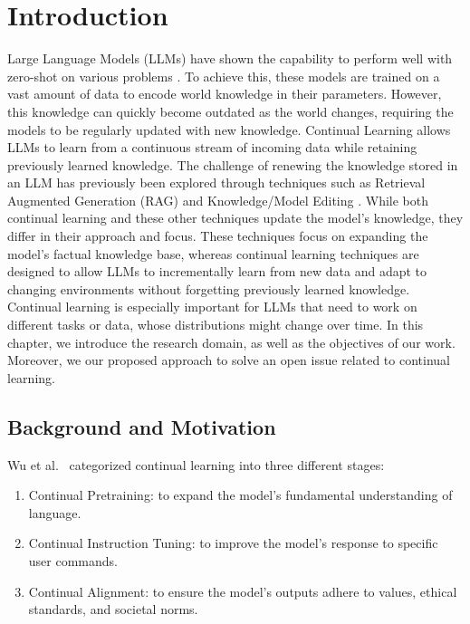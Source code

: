 
\chapter{Introduction} %

\label{Introduction} %




Large Language Models (LLMs) have shown the capability to perform well with zero-shot %
on various problems \cite{brown2020language} \cite{rae2021scaling}. 
To achieve this, these models are trained on a vast amount of data to encode world knowledge in their parameters. However, this knowledge can quickly become outdated as the world changes, requiring the models to be regularly updated with new knowledge. Continual Learning allows LLMs to learn from a continuous stream of incoming data while retaining previously learned knowledge. The challenge of renewing the knowledge stored in an LLM has previously been explored through techniques such as Retrieval Augmented Generation (RAG) and  Knowledge/Model Editing \cite{wang2023knowledge}. While both continual learning and these other techniques update the model's knowledge, they differ in their approach and focus. These techniques focus on expanding the model's factual knowledge base, whereas continual learning techniques are designed to allow LLMs to incrementally learn from new data and adapt to changing environments without forgetting previously learned knowledge. Continual learning is especially important for LLMs that need to work on different tasks or data, whose distributions might change over time. In this chapter, we introduce the research domain, as well as the objectives of our work. Moreover, we  our proposed approach to solve an open issue related to continual learning.


\section{Background and Motivation}

Wu et al.~\cite{wu2024continual} categorized continual learning into three different stages: 
\begin{enumerate}
    \item Continual Pretraining: to expand the model's fundamental understanding of language.
    \item Continual Instruction Tuning: to improve the model's response to specific user commands.
    \item Continual Alignment: to ensure the model's outputs adhere to values, ethical standards, and societal norms.
\end{enumerate}

